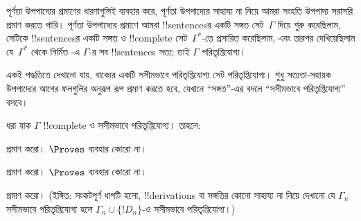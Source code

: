 \documentclass[../../../include/open-logic-section]{subfiles}
\begin{document}
      {}
      {}


পূর্ণতা উপপাদ্যের প্রমাণের ধারণাগুলিই ব্যবহার করে, পূর্ণতা উপপাদ্যের
সাহায্য না নিয়ে আমরা সংহতি উপপাদ্য সরাসরি প্রমাণ করতে পারি। পূর্ণতা
উপপাদ্যের প্রমাণে আমরা !!{sentence}sর একটি সঙ্গত সেট~$\Gamma$ দিয়ে
শুরু করেছিলাম, সেটিকে !!{sentence}sর একটি সঙ্গত ও !!{complete} সেট~$\Gamma^*$-তে প্রসারিত করেছিলাম, এবং
তারপর দেখিয়েছিলাম যে~$\Gamma^*$ থেকে নির্মিত
-এ
$\Gamma$-র সব !!{sentence}s সত্য; তাই $\Gamma$ পরিতৃপ্তিযোগ্য।

একই পদ্ধতিতে দেখানো যায়, বাক্যের একটি সসীমভাবে পরিতৃপ্তিযোগ্য সেট
পরিতৃপ্তিযোগ্য। শুধু সত্যতা-সহায়ক উপপাদ্যের আগের ফলগুলির অনুরূপ রূপ
প্রমাণ করতে হবে, যেখানে “সঙ্গত”-এর বদলে “সসীমভাবে পরিতৃপ্তিযোগ্য” বসবে।

\begin{prop}
ধরা যাক $\Gamma$ !!{complete} ও সসীমভাবে পরিতৃপ্তিযোগ্য। তাহলে:
\begin{enumerate}


\end{enumerate}
\end{prop}

\begin{prob}
 প্রমাণ করো। $\Proves$ ব্যবহার কোরো
না।
\end{prob}
\tagendprob

\begin{prob}
 প্রমাণ করো। $\Proves$ ব্যবহার কোরো
না।
\end{prob}
\tagendprob


\begin{prob}
 প্রমাণ করো। (ইঙ্গিত: সংকটপূর্ণ ধাপটি
হলো, !!{derivation}s বা সঙ্গতির কোনো সাহায্য না নিয়ে দেখানো যে
$\Gamma_n$ সসীমভাবে পরিতৃপ্তিযোগ্য হলে $\Gamma_n \cup \{!D_n\}$-ও
সসীমভাবে পরিতৃপ্তিযোগ্য।)
\end{prob}
\tagendprob
\end{document}
